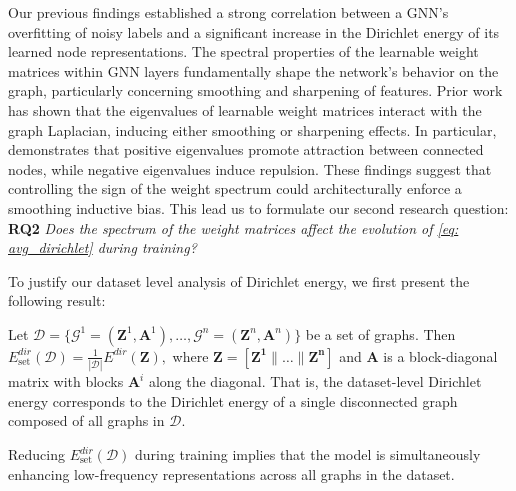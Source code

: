 

Our previous findings established a strong correlation between a GNN's overfitting of noisy labels and a significant increase in the Dirichlet energy of its learned node representations. 
The spectral properties of the learnable weight matrices within GNN layers fundamentally shape the network's behavior on the graph, particularly concerning smoothing and sharpening of features. Prior work~\citet{noteonoversmoothing, oversmoothing2, GRAFF} has shown that the eigenvalues of learnable weight matrices interact with the graph Laplacian, inducing either smoothing or sharpening effects. In particular, \citet{GRAFF} demonstrates that positive eigenvalues promote attraction between connected nodes, while negative eigenvalues induce repulsion.
These findings suggest that controlling the sign of the weight spectrum could architecturally enforce a smoothing inductive bias. 
This lead us to formulate our second research question: \textbf{RQ2} \textit{Does the spectrum of the weight matrices affect the evolution of \eqref{eq: avg_dirichlet} during training?}



To justify our dataset level analysis of Dirichlet energy, we first present the following result:

\begin{proposition}
\label{theorem: avg_dirichlet}
Let $\mathcal{D} = \{ \mathcal{G}^1= (\mathbf{Z}^1, \mathbf{A}^1), \ldots, \mathcal{G}^{n} = (\mathbf{Z}^n, \mathbf{A}^n) \}$ be a set of graphs. Then
\(
E^{dir}_\text{set}(\mathcal{D}) = \frac{1}{|\mathcal{D}|} E^{dir}(\mathbf{Z}),
\)
where $\mathbf{Z} = [\mathbf{Z^1} \| \ldots \| \mathbf{Z^n}]$ and $\mathbf{A}$ is a block-diagonal matrix with blocks $\mathbf{A}^i$ along the diagonal. That is, the dataset-level Dirichlet energy corresponds to the Dirichlet energy of a single disconnected graph composed of all graphs in $\mathcal{D}$.
\end{proposition} 
\begin{remark}
\label{cor: avg_energy}
Reducing $E^{dir}_\text{set}(\mathcal{D})$ during training implies that the model is simultaneously enhancing low-frequency representations across all graphs in the dataset.
\end{remark}

